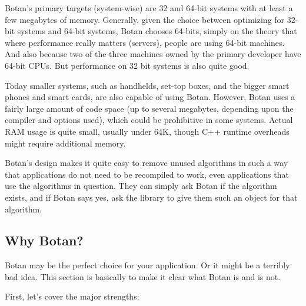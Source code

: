 \documentclass{article}
\begin{document}
Botan's primary targets (system-wise) are 32 and 64-bit systems with
at least a few megabytes of memory. Generally, given the choice
between optimizing for 32-bit systems and 64-bit systems, Botan
chooses 64-bits, simply on the theory that where performance really
matters (servers), people are using 64-bit machines. And also because
two of the three machines owned by the primary developer have 64-bit
CPUs. But performance on 32 bit systems is also quite good.

Today smaller systems, such as handhelds, set-top boxes, and the
bigger smart phones and smart cards, are also capable of using
Botan. However, Botan uses a fairly large amount of code space (up to
several megabytes, depending upon the compiler and options used),
which could be prohibitive in some systems. Actual RAM usage is quite
small, usually under 64K, though C++ runtime overheads might require
additional memory.

Botan's design makes it quite easy to remove unused algorithms in such a way
that applications do not need to be recompiled to work, even applications that
use the algorithms in question. They can simply ask Botan if the algorithm
exists, and if Botan says yes, ask the library to give them such an object for
that algorithm.

\pagebreak

\subsection{Why Botan?}

Botan may be the perfect choice for your application. Or it might be a
terribly bad idea. This section is basically to make it clear what Botan is
and is not.

First, let's cover the major strengths:
\end{document}
